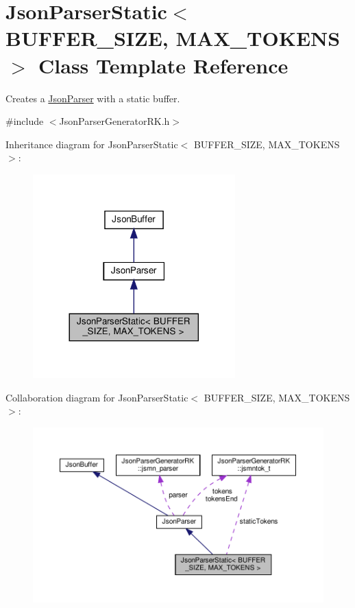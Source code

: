 \hypertarget{class_json_parser_static}{}\section{Json\+Parser\+Static$<$ B\+U\+F\+F\+E\+R\+\_\+\+S\+I\+ZE, M\+A\+X\+\_\+\+T\+O\+K\+E\+NS $>$ Class Template Reference}
\label{class_json_parser_static}


Creates a \hyperlink{class_json_parser}{Json\+Parser} with a static buffer.  




{\ttfamily \#include $<$Json\+Parser\+Generator\+R\+K.\+h$>$}



Inheritance diagram for Json\+Parser\+Static$<$ B\+U\+F\+F\+E\+R\+\_\+\+S\+I\+ZE, M\+A\+X\+\_\+\+T\+O\+K\+E\+NS $>$\+:\nopagebreak
\begin{figure}[H]
\begin{center}
\leavevmode
\includegraphics[width=221pt]{class_json_parser_static__inherit__graph}
\end{center}
\end{figure}


Collaboration diagram for Json\+Parser\+Static$<$ B\+U\+F\+F\+E\+R\+\_\+\+S\+I\+ZE, M\+A\+X\+\_\+\+T\+O\+K\+E\+NS $>$\+:\nopagebreak
\begin{figure}[H]
\begin{center}
\leavevmode
\includegraphics[width=350pt]{class_json_parser_static__coll__graph}
\end{center}
\end{figure}
